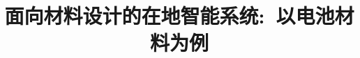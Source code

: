 
\title{面向材料设计的在地智能系统:~以电池材料为例}
\author[ ]{}   %
\renewcommand*{\Authfont}{\small\rm} %
\renewcommand*{\Affilfont}{\small\it} %
\renewcommand\Authands{ and } %
\renewcommand\Authands{ , } %
\date{} %


